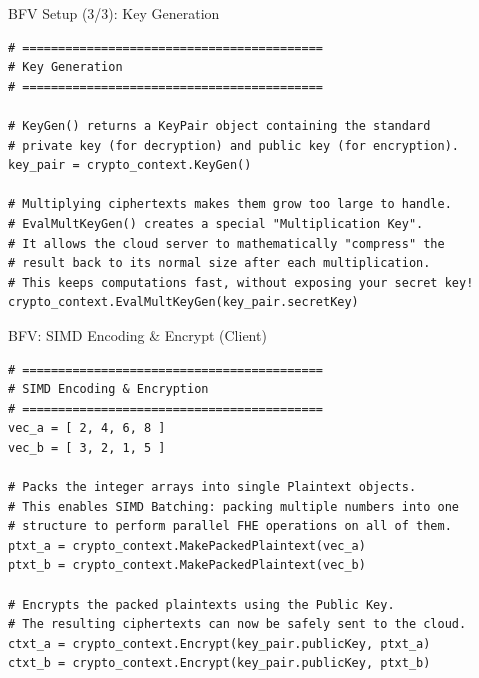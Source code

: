 \documentclass[aspectratio=169, 10pt]{beamer}
\begin{document}
\begin{frame}[fragile]{BFV Setup (3/3): Key Generation}
\vspace{0.1cm}
\begin{lstlisting}[firstnumber=13]
# ==========================================
# Key Generation
# ==========================================

# KeyGen() returns a KeyPair object containing the standard 
# private key (for decryption) and public key (for encryption).
key_pair = crypto_context.KeyGen()

# Multiplying ciphertexts makes them grow too large to handle. 
# EvalMultKeyGen() creates a special "Multiplication Key".
# It allows the cloud server to mathematically "compress" the 
# result back to its normal size after each multiplication.
# This keeps computations fast, without exposing your secret key!
crypto_context.EvalMultKeyGen(key_pair.secretKey) 
\end{lstlisting}
\end{frame}

\begin{frame}[fragile]{BFV: SIMD Encoding \& Encrypt (Client)}
\vspace{0.1cm}
\begin{lstlisting}[firstnumber=18]
# ==========================================
# SIMD Encoding & Encryption
# ==========================================
vec_a = [ 2, 4, 6, 8 ]
vec_b = [ 3, 2, 1, 5 ]

# Packs the integer arrays into single Plaintext objects.
# This enables SIMD Batching: packing multiple numbers into one
# structure to perform parallel FHE operations on all of them.
ptxt_a = crypto_context.MakePackedPlaintext(vec_a)
ptxt_b = crypto_context.MakePackedPlaintext(vec_b)

# Encrypts the packed plaintexts using the Public Key.
# The resulting ciphertexts can now be safely sent to the cloud.
ctxt_a = crypto_context.Encrypt(key_pair.publicKey, ptxt_a)
ctxt_b = crypto_context.Encrypt(key_pair.publicKey, ptxt_b)
\end{lstlisting}
\end{frame}
\end{document}
